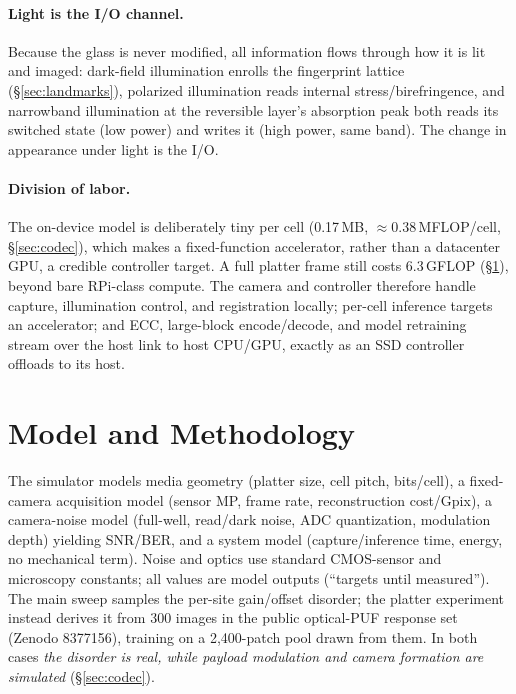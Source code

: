 \documentclass[letterpaper,twocolumn,10pt]{article}
\begin{document}
\paragraph{Light is the I/O channel.} Because the glass is never modified, all
information flows through how it is lit and imaged: dark-field illumination enrolls the
fingerprint lattice (\S\ref{sec:landmarks}), polarized illumination reads internal
stress/birefringence, and narrowband illumination at the reversible layer's absorption
peak both reads its switched state (low power) and writes it (high power, same band). The
change in appearance under light is the I/O.

\paragraph{Division of labor.} The on-device model is deliberately tiny per cell
(0.17\,MB, $\approx$0.38\,MFLOP/cell, \S\ref{sec:codec}), which makes a
fixed-function accelerator, rather than a datacenter GPU, a credible controller
target.  A full platter frame still costs 6.3\,GFLOP (\S\ref{sec:model}), beyond bare
RPi-class compute.  The camera and controller therefore handle capture, illumination
control, and registration locally; per-cell inference targets an accelerator; and ECC,
large-block encode/decode, and model retraining stream over the host link to host
CPU/GPU, exactly as an SSD controller offloads to its host.

\section{Model and Methodology}
\label{sec:model}
The simulator models media geometry (platter size, cell pitch, bits/cell), a fixed-camera
acquisition model (sensor MP, frame rate, reconstruction cost/Gpix), a camera-noise model
(full-well, read/dark noise, ADC quantization, modulation depth) yielding SNR/BER, and a
system model (capture/inference time, energy, no mechanical term). Noise and optics use
standard CMOS-sensor and microscopy constants; all values are model outputs
(``targets until measured''). The main sweep samples the per-site gain/offset
disorder; the platter experiment instead derives it from 300 images in the
public optical-PUF response set (Zenodo 8377156), training on a 2{,}400-patch
pool drawn from them.  In both cases \emph{the disorder is real, while payload
modulation and camera formation are simulated} (\S\ref{sec:codec}).
\end{document}

